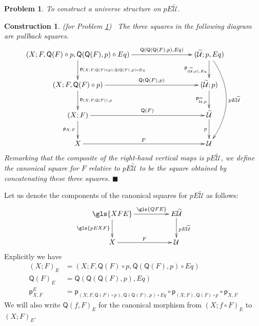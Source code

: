 \documentclass[12pt]{article}
\numberwithin{equation}{section}
\newenvironment{eq}{\begin{equation}}{\end{equation}}
\newtheorem{problem}[proposition]{Problem}
\newtheorem{construction0}[proposition]{Construction}
\newenvironment{construction}[1]{\begin{construction0}(for Problem \ref{#1})\ }{$\blacksquare$ \end{construction0}}
\newcommand{\wt}{\widetilde}
\newcommand{\p}{\mathsf{p}}
\newcommand{\U}{\mathcal{U}}
\newcommand{\Q}{\mathsf{Q}}
\begin{document}
\begin{problem}
\label{2015.05.08.prob1} To construct a universe structure on $pE\wt{\U}$.
\end{problem}
%
\begin{construction}{2015.05.08.prob1}\rm
\label{2015.05.08.constr1} The three squares in the following diagram are pullback squares.
\begin{eq}\label{pEU-diagram}
  \begin{xy}
    \xymatrix@C=7pc{
      (X;F,\Q(F)\circ p, \Q(\Q(F),p)\circ Eq)
          \ar[r]^-{\Q(\Q(\Q(F),p),Eq)}
          \ar[d]^-{\p_{(X;F,\Q(F)\circ p), \Q(\Q(F),p)\circ Eq}}                  & (\wt{\U}; p, Eq) \ar[d]_{\p_{(\wt{\U};p),Eq}} \ar@/^2pc/[ddd]^{pE\wt{\U}} \\
      (X;F,\Q(F)\circ p) 
          \ar[r]^-{\Q(\Q(F),p)} 
          \ar[d]^-{\p_{(X;F,\Q(F)), p}}                                           & (\wt{\U};p) \ar[d]_{\p_{\wt{\U},p}} \\
      (X;F) 
          \ar[r]^-{\Q(F)} 
          \ar[d]_{\p_{X,F}}                                                       & \wt{\U} \ar[d]_{p} \\
      X \ar[r]^{F}                                                                & \U
    }
  \end{xy}
\end{eq}%
Remarking that the composite of the right-hand vertical maps is $pE\wt{\U}$, we
define the canonical square for $F$ relative to $pE\wt{\U}$ to be the
square obtained by concatenating these three squares.
\end{construction}
%
Let us denote the components of the canonical squares for $pE\wt{\U}$ as
follows:
%
\begin{eq}
          \xymatrix@C=4pc{ \gls{XFE} \ar[r]^-{\gls{QFE}} \ar[d]_{\gls{pEXF}} &
            E\wt{\U} \ar[d]^{pE\wt{\U}}\\ X \ar[r]^{F} & \U }
\end{eq}
%
Explicitly we have
%
\begin{align}
  (X;F)_{E}&=(X;F,\Q(F)\circ p, \Q(\Q(F),p)\circ Eq) \\
  \Q(F)_{E}&=\Q(\Q(\Q(F),p),Eq) \label{defQFE} \\
  \p_{X,F}^E&=\p_{(X;F,\Q(F)\circ p),\Q(\Q(F),p)\circ Eq}\circ \p_{(X;F),\Q(F)\circ p}\circ \p_{X,F}
\end{align}
%
We will also write $\Q(f,F)_{E}$ for the canonical morphism from $(X;f\circ
F)_{E}$ to $(X;F)_{E}$.
%
\end{document}
